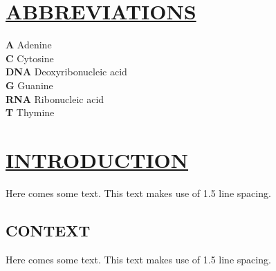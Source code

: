\documentclass[fontsize=13pt]{scrartcl}
\begin{document}
{{{{{{{\section*{\uline{ABBREVIATIONS}}
\textbf{A}  \hspace{1cm}  Adenine \\

\bigskip
\noindent \textbf{C} \hspace{1cm}  Cytosine \\

\bigskip
\noindent \textbf{DNA} \hspace{0.4cm}  Deoxyribonucleic acid\\

\bigskip
\noindent \textbf{G} \hspace{1cm}  Guanine\\

\bigskip
\noindent \textbf{RNA} \hspace{0.4cm}  Ribonucleic acid\\

\bigskip
\noindent \textbf{T} \hspace{1cm}  Thymine\\
\pagebreak
\clearpage\mbox{}\clearpage
\tableofcontents
\pagebreak
{}
\section{\uline{INTRODUCTION}}
Here comes some text. This text makes use of 1.5 line spacing. 
\subsection{CONTEXT}
Here comes some text. This text makes use of 1.5 line spacing. 
}}}}}}}
\end{document}
